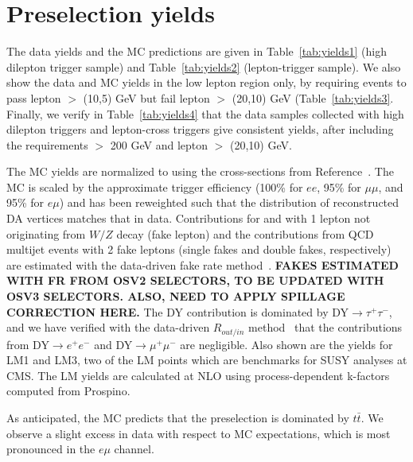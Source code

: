 \section{Preselection yields}
\label{sec:yields}

The data yields and the MC predictions are given in Table~\ref{tab:yields1} (high \pt dilepton
trigger sample) and Table~\ref{tab:yields2} (lepton-\Ht trigger sample). We also show the
data and MC yields in the low \pt lepton region only, by requiring events to pass lepton
\pt $>$ (10,5) GeV but fail lepton \pt $>$ (20,10) GeV (Table~\ref{tab:yields3}.
Finally, we verify in Table~\ref{tab:yields4} that the data samples collected with high \pt dilepton
triggers and lepton-\Ht cross triggers give consistent yields, after including the requirements
\Ht $>$ 200 GeV and lepton \pt $>$ (20,10) GeV.

The MC yields are normalized to \lumi using the cross-sections
from Reference~\cite{ref:xsec}. The MC is scaled by the approximate trigger efficiency (100\% for $ee$,
95\% for $\mu\mu$, and 95\% for $e\mu$) and has been reweighted such that the distribution of 
reconstructed DA vertices matches that in data. Contributions for \ttfake and \wjets  
with 1 lepton not originating from $W/Z$ decay (fake lepton) and the contributions from QCD multijet events 
with 2 fake leptons (single fakes and double fakes, respectively) are estimated with the data-driven
fake rate method~\cite{ref:top}. {\color{red} \bf FAKES ESTIMATED WITH FR FROM OSV2 SELECTORS, TO BE 
UPDATED WITH OSV3 SELECTORS. ALSO, NEED TO APPLY SPILLAGE CORRECTION HERE.}
The DY contribution is dominated by DY$\rightarrow \tau^+\tau^-$,
and we have verified with the data-driven $R_{out/in}$ method~\cite{ref:top} that the
contributions from DY$\to e^{+}e^{-}$ and DY$\to \mu^{+}\mu^{-}$ are negligible.
Also shown are the yields for LM1 and LM3, two of the LM 
points which are benchmarks for SUSY analyses at CMS. The LM yields
are calculated at NLO using process-dependent k-factors computed from Prospino.

As anticipated, the MC predicts that the preselection is dominated by $t\bar{t}$.  
We observe a slight excess in data with respect to MC expectations, which is most pronounced in the $e\mu$ channel.

